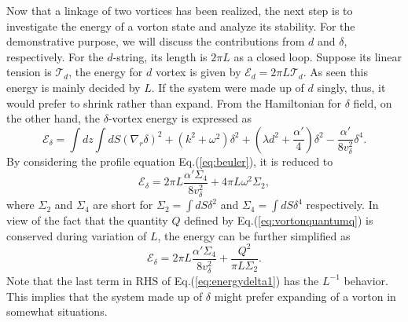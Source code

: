 \documentclass[prd, showpacs,nofootinbib,amsmath,amssymb]{revtex4}
\begin{document}
Now that a linkage of two vortices has been realized, the next step is to investigate the energy of a vorton state
and analyze its stability. For the demonstrative purpose, we will discuss the contributions from $d$ and
$\delta$, respectively. For the $d$-string, its length is $2 \pi L$ as a closed loop.
Suppose its linear tension is $\mathcal{T}_d$, the energy for $d$ vortex is given by
$\mathcal{E}_d = 2\pi L \mathcal{T}_d$. As seen this energy is mainly decided by $L$. 
If the system were made up of $d$ singly, thus, it would prefer to shrink
rather than expand.
From the Hamiltonian for $\delta$ field, on the other hand, the $\delta$-vortex energy is expressed as 
\begin{equation}
  \label{eq:deltah}
  \mathcal{E}_\delta = \int dz \int dS  (\nabla_r \delta)^2 + (k^2 + \omega^2)\delta^2 + (\lambda d^2 + \frac{\alpha'}{4})\delta^2 - \frac{\alpha'}{8v_\delta^2}\delta^4.
\end{equation}
By considering the profile equation Eq.(\ref{eq:beuler}), it is reduced to
\begin{equation}
  \label{eq:energydelta}
  \mathcal{E}_{\delta} =  2\pi L\frac{\alpha' \Sigma_4}{8v_\delta^2} + 4 \pi L \omega^2 \Sigma_2,
\end{equation}
where $\Sigma_2$ and $\Sigma_4$ are short for
$\Sigma_2 = \int dS \delta^2$ and $\Sigma_4 = \int dS \delta^4$ respectively.
In view of the fact that the quantity $Q$ defined by Eq.(\ref{eq:vortonquantumq}) is
conserved during variation of $L$, the energy can be further simplified as
\begin{equation}
  \label{eq:energydelta1}
  \mathcal{E}_{\delta} =  2\pi L\frac{\alpha' \Sigma_4}{8v_\delta^2} + \frac{Q^2}{\pi L \Sigma_2}.
\end{equation}
Note that the last term in RHS of Eq.(\ref{eq:energydelta1}) has the
$L^{-1}$ behavior. 
This implies that the system made up of $\delta$ might prefer expanding of a vorton in somewhat situations.
%
\end{document}
